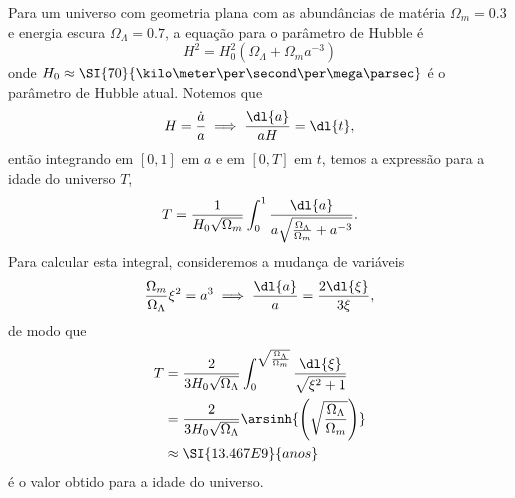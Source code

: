 Para um universo com geometria plana com as abundâncias de matéria \(\Omega_m = 0.3\) e energia escura \(\Omega_{\Lambda} = 0.7\), a equação para o parâmetro de Hubble é
\begin{equation*}
    H^2 = H_0^2\left(\Omega_{\Lambda} + \Omega_m a^{-3}\right)
\end{equation*}
onde \(H_0 \approx \SI{70}{\kilo\meter\per\second\per\mega\parsec}\) é o parâmetro de Hubble atual. Notemos que
\begin{equation*}
    H = \frac{\dot{a}}{a} \implies \frac{\dl{a}}{aH} = \dl{t},
\end{equation*}
então integrando em \([0,1]\) em \(a\) e em \([0,T]\) em \(t\), temos a expressão para a idade do universo \(T\),
\begin{equation*}
    T = \frac{1}{H_0\sqrt{\Omega_m}}\int_{0}^{1} \frac{\dl{a}}{a\sqrt{\frac{\Omega_{\Lambda}}{\Omega_m} + a^{-3}}}.
\end{equation*}
Para calcular esta integral, consideremos a mudança de variáveis
\begin{equation*}
    \frac{\Omega_{m}}{\Omega_{\Lambda}}\xi^2 = a^3 \implies \frac{\dl{a}}{a} = \frac{2\dl{\xi}}{3\xi},
\end{equation*}
de modo que
\begin{align*}
    T &= \frac{2}{3H_0 \sqrt{\Omega_\Lambda}} \int_0^{\sqrt{\frac{\Omega_{\Lambda}}{\Omega_m}}}\frac{\dl{\xi}}{\sqrt{\xi^2 + 1}}\\
      &= \frac{2}{3H_0 \sqrt{\Omega_\Lambda}} \arsinh{\left(\sqrt{\frac{\Omega_{\Lambda}}{\Omega_m}}\right)}\\
      &\approx \SI{13.467E9}{anos}
\end{align*}
é o valor obtido para a idade do universo.
